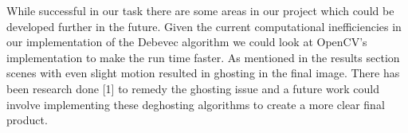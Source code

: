 \documentclass[
	a4paper, %
	10pt, %
	unnumberedsections, %
	twoside, %
]{LTJournalArticle}
\begin{document}
While successful in our task there are some areas in our project which could be developed further in the future. Given the current computational inefficiencies in our implementation of the Debevec algorithm we could look at OpenCV’s implementation to make the run time faster. 
As mentioned in the results section scenes with even slight motion resulted in ghosting in the final image. There has been research done [1] to remedy the ghosting issue and a future work could involve implementing these deghosting algorithms to create a more clear final product.



\printbibliography %

\end{document}
